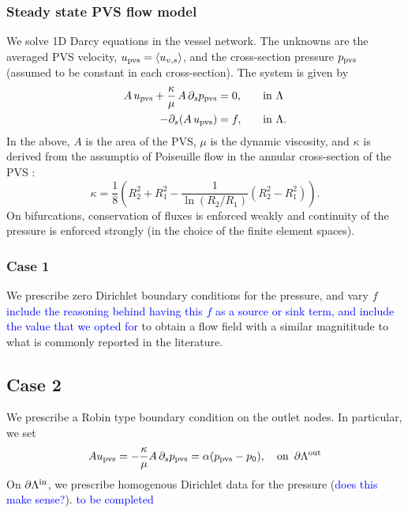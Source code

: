 \documentclass[fleqn,10pt]{wlscirep}
\newcommand{\rami}[1]{\textcolor{blue}{#1}}
\begin{document}
\subsubsection*{Steady state PVS flow model} We solve 1D Darcy equations in the vessel network. The unknowns are the averaged PVS velocity, $u_{\rm pvs} = \langle u_{v,s} \rangle$, and the cross-section pressure $p_{\rm pvs} $ (assumed to be constant in each cross-section). The system is given by  \cite{daversin2022geometrically} 
\begin{alignat}{2}
A \,  u_{\rm pvs}   + \frac{\kappa}{\mu} \, A \, \partial_{s} p_{\rm pvs} & = 0, &&  \quad \rm in  \,\, \Lambda  \\ 
-\partial_s (A \, u_{\rm pvs}) & = f, && \quad \rm in  \,\, \Lambda .  
\end{alignat} 
In the above, $A$ is the area of the PVS, $\mu$ is the dynamic viscosity, and $\kappa$ is derived from the assumptio of Poiseuille
flow in the annular cross-section of the PVS \cite{daversin2022geometrically,tithof2022network}: 
\begin{equation}
\kappa = \frac18 \left( R_2^2 + R_1^2 - \frac{1}{\ln(R_2/R_1)} (R_2^2- R_1^2) \right). 
\end{equation}
On bifurcations, conservation of fluxes is enforced weakly and continuity of the pressure is enforced strongly (in the choice of the finite element spaces). 

\subsubsection*{Case 1} We prescribe zero Dirichlet boundary conditions for the pressure, and vary $f$ \rami{include the reasoning behind having this $f$ as a source or sink term, and include the value that we opted for} to obtain a flow field with a similar magnititude to what is commonly reported in the literature.  

\subsection*{Case 2} We prescribe a Robin type boundary condition on the outlet nodes. In particular, we set 
\begin{equation}
A  u_{\rm pvs} =  - \frac{\kappa}{ \mu} A\, \partial_s p_{\rm pvs} = \alpha (p_{\rm pvs} - p_0), \quad  \rm on \,\,\, \partial \Lambda^{\rm out} 
\end{equation}
On $\partial \Lambda^{\rm in}$, we prescribe homogenous Dirichlet data for the pressure (\rami{does this make sense?}). 
\rami{to be completed }
\end{document}
